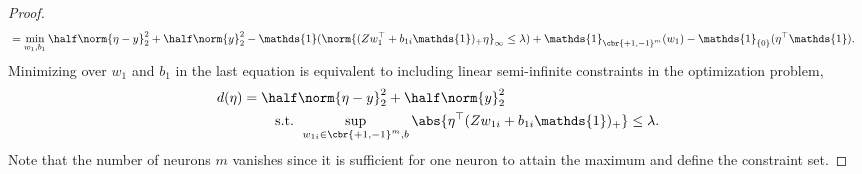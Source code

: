 \begin{proof}
\begin{align*}
		    & = \min_{w_1, b_1} \half \norm{\eta - y}_2^2 + \half \norm{y}^2_2
		- \mathds{1}(\norm{(Z w_{1}^\top + b_{1i} \mathds{1})_+ \eta}_\infty \leq \lambda) + \mathds{1}_{\cbr{+1, -1}^m}(w_{1}) - \mathds{1}_{\{0\}}(\eta^\top \mathds{1}).
	\end{align*}
	Minimizing over \( w_1 \) and \( b_1 \) in the last equation is equivalent
	to including linear semi-infinite constraints in the optimization problem,
	\begin{equation}\label{eq:1d-dual}
		\begin{aligned}
			d(\eta)
			 & =  \half \norm{\eta - y}_2^2 + \half \norm{y}^2_2              \\
			 & \hspace{2em} \text{ s.t. } \sup_{w_{1i} \in \cbr{+1, -1}^m, b}
			\abs{\eta^\top (Z w_{1i} + b_{1i} \mathds{1})_+} \leq \lambda.
		\end{aligned}
	\end{equation}
	Note that the number of neurons \( m \) vanishes since it is sufficient
	for one neuron to attain the maximum and define the constraint set.


\end{proof}
